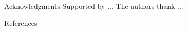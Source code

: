 \documentclass[aspectratio=169,xcolor=dvipsnames]{beamer}
\begin{document}
\begin{frame}{Acknowledgments}
  Supported by ... The authors thank ...
\end{frame}

\begin{frame}[allowframebreaks]{References}
  \scriptsize
  
  
\end{frame}

\end{document}

